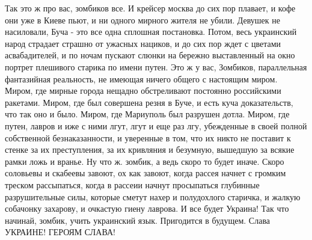Так это ж про вас, зомбиков все. И крейсер москва до сих пор плавает, и кофе
они уже в Киеве пьют, и ни одного мирного жителя не убили. Девушек не
насиловали, Буча - это все одна сплошная постановка. Потом, весь украинский
народ страдает страшно от ужасных нациков, и до сих пор ждет с цветами
асвабадителей, и по ночам пускают слюнки на бережно выставленный на окно
портрет плешивого старика по имени путен. Это ж у вас, Зомбиков, параллельная
фантазийная реальность, не имеющая ничего общего с настоящим миром. Миром, где
мирные города нещадно обстреливают постоянно российскими ракетами. Миром, где
был совершена резня в Буче, и есть куча доказательств, что так оно и было.
Миром, где Мариуполь был разрушен дотла. Миром, где путен, лавров и иже с ними
лгут, лгут и еще раз лгу, убежденные в своей полной собственной
безнаказанности, и уверенные в том, что их никто не поставит к стенке за их
преступления, за их кривляния и безумную, вышедшую за всякие рамки ложь и
вранье. Ну что ж. зомбик, а ведь скоро то будет иначе. Скоро соловьевы и
скабеевы завоют, ох как завоют, когда рассея начнет с громким треском
рассыпаться, когда в рассеии начнут просыпаться глубинные разрушительные силы,
которые сметут нахер и полудохлого старичка, и жалкую собачонку захарову, и
очкастую гиену лаврова. И все будет Украина! Так что начинай, зомбик, учить
украинский язык. Пригодится в будущем. Слава УКРАИНЕ! ГЕРОЯМ СЛАВА!
